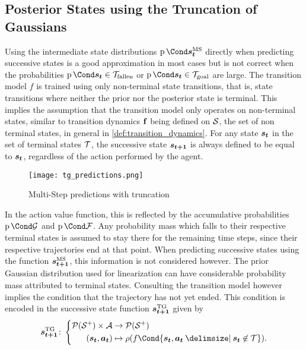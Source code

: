 \subsection{Posterior States using the Truncation of Gaussians}
Using the intermediate state distributions $\Prob{\ms{\rv{s_t}}}$ directly when predicting successive states is a good approximation in most cases but is not correct when the probabilities $\Prob{\rv{s_t} \in \Fallen}$ or $\Prob{\rv{s_t} \in \Goal}$ are large.
The transition model $f$ is trained using only non-terminal state transitions, that is, state transitions where neither the prior nor the posterior state is terminal.
This implies the assumption that the transition model only operates on non-terminal states, similar to transition dynamics $\operatorname{\mathbf{f}}$ being defined on $\mathcal{S}$, the set of non terminal states, in general in \cref{def:transition_dynamics}.
For any state $\bm{s_t}$ in the set of terminal states $\mathcal{T}$, the successive state $\bm{s_{t+1}}$ is always defined to be equal to $\bm{s_t}$, regardless of the action performed by the agent.

\begin{figure}[t]
    \centering
    \texttt{[image: tg\_predictions.png]}
    \caption{Multi-Step predictions with truncation}
    \label{fig:ms_truncation_predictions}
\end{figure}
In the action value function, this is reflected by the accumulative probabilities $\Prob{\PGoal}$ and $\Prob{\PFallen}$.
Any probability mass which falls to their respective terminal states is assumed to stay there for the remaining time steps, since their respective trajectories end at that point.
When predicting successive states using the function $\bm{s_{t+1}}^{\text{MS}}$, this information is not considered however.
The prior Gaussian distribution used for linearization can have considerable probability mass attributed to terminal states.
Consulting the transition model however implies the condition that the trajectory has not yet ended.
This condition is encoded in the successive state function $\bm{s_{t+1}}^{\text{TG}}$ given by
\begin{align}
    \tg{\mat{s_{t+1}}} \colon \left\{
        \begin{aligned}
            \Dists(\Es^+) \times \Ah &\to \Dists(\Es^+) \\
            (\rv{s_t}, \mat{a_t}) &\mapsto \squeeze(f\Cond{\rv{s_t}, \mat{a_t} \given \rv{s_t} \not\in \Tee}).
    \end{aligned}
    \right.
\end{align}

